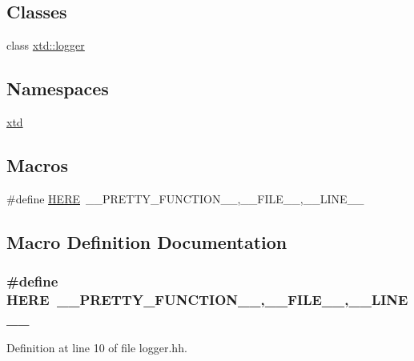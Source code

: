 \subsection*{Classes}
\begin{DoxyCompactItemize}
\item 
class \hyperlink{classxtd_1_1logger}{xtd\-::logger}
\end{DoxyCompactItemize}
\subsection*{Namespaces}
\begin{DoxyCompactItemize}
\item 
\hyperlink{namespacextd}{xtd}
\end{DoxyCompactItemize}
\subsection*{Macros}
\begin{DoxyCompactItemize}
\item 
\#define \hyperlink{logger_8hh_a3fe03e23176f4fe277d1d3b41f3d3d06}{H\-E\-R\-E}~\-\_\-\-\_\-\-P\-R\-E\-T\-T\-Y\-\_\-\-F\-U\-N\-C\-T\-I\-O\-N\-\_\-\-\_\-,\-\_\-\-\_\-\-F\-I\-L\-E\-\_\-\-\_\-,\-\_\-\-\_\-\-L\-I\-N\-E\-\_\-\-\_\-
\end{DoxyCompactItemize}


\subsection{Macro Definition Documentation}
\hypertarget{logger_8hh_a3fe03e23176f4fe277d1d3b41f3d3d06}{
\subsubsection[{H\-E\-R\-E}]{\setlength{\rightskip}{0pt plus 5cm}\#define H\-E\-R\-E~\-\_\-\-\_\-\-P\-R\-E\-T\-T\-Y\-\_\-\-F\-U\-N\-C\-T\-I\-O\-N\-\_\-\-\_\-,\-\_\-\-\_\-\-F\-I\-L\-E\-\_\-\-\_\-,\-\_\-\-\_\-\-L\-I\-N\-E\-\_\-\-\_\-}}\label{logger_8hh_a3fe03e23176f4fe277d1d3b41f3d3d06}


Definition at line 10 of file logger.\-hh.

